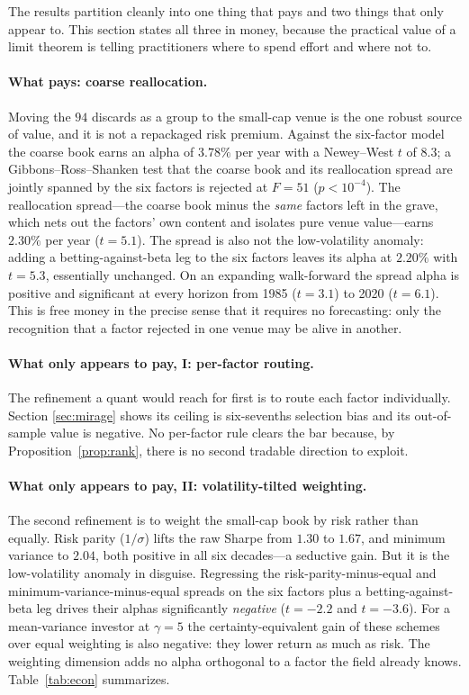 \documentclass[12pt]{article}
\theoremstyle{plain}
\theoremstyle{definition}
\begin{document}
The results partition cleanly into one thing that pays and two things that only
appear to. This section states all three in money, because the practical value of
a limit theorem is telling practitioners where to spend effort and where not to.

\paragraph{What pays: coarse reallocation.} Moving the $94$ discards as a group to
the small-cap venue is the one robust source of value, and it is not a repackaged
risk premium. Against the six-factor model the coarse book earns an alpha of
$3.78\%$ per year with a Newey--West $t$ of $8.3$; a Gibbons--Ross--Shanken test
that the coarse book and its reallocation spread are jointly spanned by the six
factors is rejected at $F=51$ ($p<10^{-4}$). The reallocation spread---the coarse
book minus the \emph{same} factors left in the grave, which nets out the factors'
own content and isolates pure venue value---earns $2.30\%$ per year ($t=5.1$).
The spread is also not the low-volatility anomaly: adding a
betting-against-beta leg to the six factors leaves its alpha at $2.20\%$ with
$t=5.3$, essentially unchanged. On an expanding walk-forward the spread alpha is
positive and significant at every horizon from 1985 ($t=3.1$) to 2020 ($t=6.1$).
This is free money in the precise sense that it requires no forecasting: only the
recognition that a factor rejected in one venue may be alive in another.

\paragraph{What only appears to pay, I: per-factor routing.} The refinement a
quant would reach for first is to route each factor individually. Section
\ref{sec:mirage} shows its ceiling is six-sevenths selection bias and its
out-of-sample value is negative. No per-factor rule clears the bar because, by
Proposition~\ref{prop:rank}, there is no second tradable direction to exploit.

\paragraph{What only appears to pay, II: volatility-tilted weighting.} The second
refinement is to weight the small-cap book by risk rather than equally. Risk
parity ($1/\sigma$) lifts the raw Sharpe from $1.30$ to $1.67$, and minimum
variance to $2.04$, both positive in all six decades---a seductive gain. But it
is the low-volatility anomaly in disguise. Regressing the risk-parity-minus-equal
and minimum-variance-minus-equal spreads on the six factors plus a
betting-against-beta leg drives their alphas significantly \emph{negative}
($t=-2.2$ and $t=-3.6$). For a mean-variance investor at $\gamma=5$ the
certainty-equivalent gain of these schemes over equal weighting is also negative:
they lower return as much as risk. The weighting dimension adds no alpha
orthogonal to a factor the field already knows. Table~\ref{tab:econ} summarizes.
\end{document}
